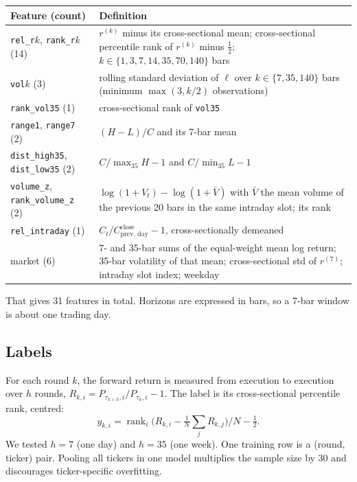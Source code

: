 \documentclass[11pt,a4paper]{article}
\newcommand{\code}[1]{\texttt{#1}}
\DeclareMathOperator{\rank}{rank}
\begin{document}
\begin{center}\small
\begin{tabularx}{\linewidth}{lX}
\toprule
Feature (count) & Definition \\
\midrule
\code{rel\_r$k$}, \code{rank\_r$k$} (14) & $r^{(k)}$ minus its cross-sectional mean; cross-sectional percentile rank of $r^{(k)}$ minus $\tfrac12$; $k\in\{1,3,7,14,35,70,140\}$ bars \\
\code{vol$k$} (3) & rolling standard deviation of $\ell$ over $k\in\{7,35,140\}$ bars (minimum $\max(3,k/2)$ observations) \\
\code{rank\_vol35} (1) & cross-sectional rank of \code{vol35} \\
\code{range1}, \code{range7} (2) & $(H-L)/C$ and its 7-bar mean \\
\code{dist\_high35}, \code{dist\_low35} (2) & $C/\max_{35}H-1$ and $C/\min_{35}L-1$ \\
\code{volume\_z}, \code{rank\_volume\_z} (2) & $\log(1+V_t)-\log(1+\bar V)$ with $\bar V$ the mean volume of the previous 20 bars in the same intraday slot; its rank \\
\code{rel\_intraday} (1) & $C_t/C^{\text{close}}_{\text{prev.\ day}}-1$, cross-sectionally demeaned \\
market (6) & 7- and 35-bar sums of the equal-weight mean log return; 35-bar volatility of that mean; cross-sectional std of $r^{(7)}$; intraday slot index; weekday \\
\bottomrule
\end{tabularx}
\end{center}
That gives 31 features in total. Horizons are expressed in bars, so a 7-bar window is about one trading day.

\subsection{Labels}
For each round $k$, the forward return is measured from execution to execution over $h$ rounds,
$R_{k,i}=P_{\tau_{k+h},i}/P_{\tau_k,i}-1$. The label is its cross-sectional percentile rank, centred:
\begin{equation}
  y_{k,i}=\rank_i\!\big(R_{k,i}-\tfrac1N\textstyle\sum_jR_{k,j}\big)/N-\tfrac12 .
\end{equation}
We tested $h=7$ (one day) and $h=35$ (one week). One training row is a (round, ticker) pair. Pooling all tickers in one
model multiplies the sample size by 30 and discourages ticker-specific overfitting.
\end{document}
